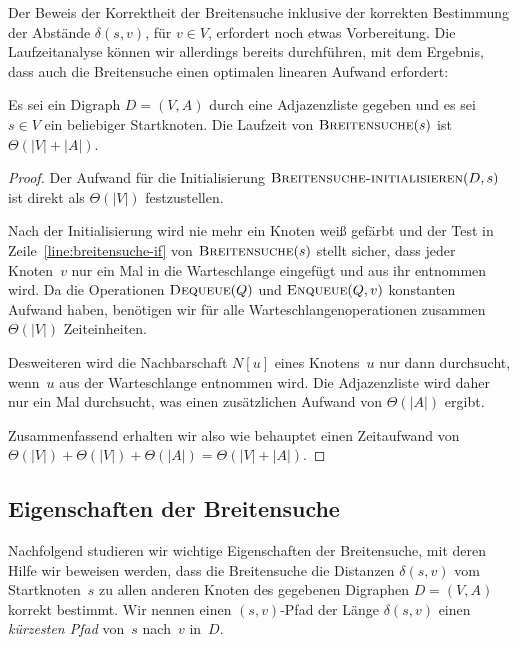 \begin{bem}
Der Beweis der Korrektheit der Breitensuche inklusive der korrekten Bestimmung der Abstände $\delta(s,v)$, für $v \in V$, erfordert noch etwas Vorbereitung.
Die Laufzeitanalyse können wir allerdings bereits durchführen, mit dem Ergebnis, dass auch die Breitensuche einen optimalen linearen Aufwand erfordert:
\end{bem}

\begin{thm}
\label{thm:laufzeit-breitensuche}
Es sei ein Digraph $D=(V,A)$ durch eine Adjazenzliste gegeben und es sei $s \in V$ ein beliebiger Startknoten.
Die Laufzeit von $\mathop{\text{\textsc{Breitensuche}}}(s)$ ist $\Theta(|V|+|A|)$.
\end{thm}

\begin{proof}
Der Aufwand für die Initialisierung $\mathop{\text{\textsc{Breitensuche-initialisieren}}}(D,s)$ ist direkt als $\Theta(|V|)$ festzustellen.

Nach der Initialisierung wird nie mehr ein Knoten weiß gefärbt und der Test in Zeile~\ref{line:breitensuche-if} von $\mathop{\text{\textsc{Breitensuche}}}(s)$ stellt sicher, dass jeder Knoten~$v$ nur ein Mal in die Warteschlange eingefügt und aus ihr entnommen wird.
Da die Operationen $\mathop{\text{\textsc{Dequeue}}}(Q)$ und $\mathop{\text{\textsc{Enqueue}}}(Q,v)$ konstanten Aufwand haben, benötigen wir für alle Warteschlangenoperationen zusammen $\Theta(|V|)$ Zeiteinheiten.

Desweiteren wird die Nachbarschaft $N[u]$ eines Knotens~$u$ nur dann durchsucht, wenn~$u$ aus der Warteschlange entnommen wird.
Die Adjazenzliste wird daher nur ein Mal durchsucht, was einen zusätzlichen Aufwand von $\Theta(|A|)$ ergibt. 

Zusammenfassend erhalten wir also  wie behauptet einen Zeitaufwand von $\Theta(|V|) + \Theta(|V|) + \Theta(|A|) = \Theta(|V|+|A|)$.
\end{proof}


\subsection{Eigenschaften der Breitensuche}
\label{sect:breitensuche-eigenschaften}

\begin{bem}
Nachfolgend studieren wir wichtige Eigenschaften der Breitensuche, mit deren Hilfe wir beweisen werden, dass die Breitensuche die Distanzen $\delta(s,v)$ vom Startknoten~$s$ zu allen anderen Knoten des gegebenen Digraphen $D=(V,A)$ korrekt bestimmt.
Wir nennen einen $(s,v)$-Pfad der Länge $\delta(s,v)$ einen \emph{kürzesten Pfad} von~$s$ nach~$v$ in~$D$.
\end{bem}

